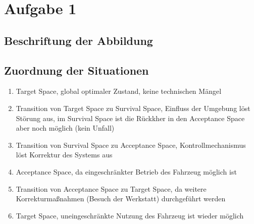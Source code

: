 \documentclass[
fontsize=12pt,          %
paper=a4,               %
captions=tableabove,    %
titlepage=firstiscover, %
BCOR=5mm,               %
toc=listof,             %
open=right,             %
]{scrreprt}
\begin{document}
	
\chapter{Aufgabe 1}

\section{Beschriftung der Abbildung}


\section{Zuordnung der Situationen}
\begin{enumerate}
	\item Target Space, global optimaler Zustand, keine technischen Mängel
	\item Transition von Target Space zu Survival Space, Einfluss der Umgebung löst Störung aus, im Survival Space ist die Rückkher in den Acceptance Space aber noch möglich (kein Unfall)
	\item Transition von Survival Space zu Acceptance Space, Kontrollmechanismus löst Korrektur des Systems aus
	\item Acceptance Space, da eingeschränkter Betrieb des Fahrzeug möglich ist
	\item Transition von Acceptance Space zu Target Space, da weitere Korrekturmaßnahmen (Besuch der Werkstatt) durchgeführt werden
	\item Target Space, uneingeschränkte Nutzung des Fahrzeug ist wieder möglich
\end{enumerate}
\end{document}
